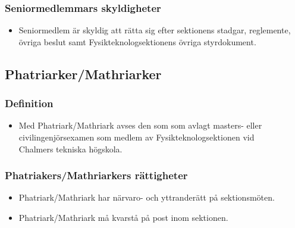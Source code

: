 \documentclass[11pt,a4paper]{article}
\begin{document}
\subsubsection{Seniormedlemmars skyldigheter}

\begin{itemize}


\item Seniormedlem är skyldig att rätta sig efter sektionens stadgar,
   regle\-mente, övriga beslut samt  Fysikteknologsektionens övriga styrdokument.
\end{itemize}





\subsection{Phatriarker/Mathriarker}

\subsubsection{Definition}

\begin{itemize}

  \item Med Phatriark/Mathriark avses den som som avlagt masters-
  eller civil\-ingenjörs\-examen som medlem av Fysik\-teknolog\-sektionen vid\\
  Ch\-al\-mers tekniska högskola.
 
\end{itemize}

\subsubsection{Phatriakers/Mathriarkers rättigheter}

\begin{itemize}

   \item Phatriark/Mathriark har närvaro- och yttranderätt på sektionsmöten.

   \item Phatriark/Mathriark må kvarstå på post inom sektionen.

\end{itemize}
\end{document}
